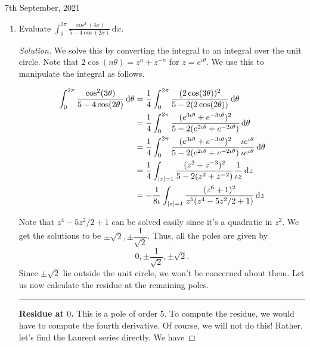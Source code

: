 \documentclass[11pt]{article}
\theoremstyle{definition}
\newenvironment{soln}{\begin{proof}[Solution]}{\end{proof}}
\begin{document}
\begin{center}
    7th September, 2021
\end{center}
\begin{enumerate}[leftmargin=*]
    \itemsep0.5em
    \item Evaluate $\displaystyle \int_0^{2\pi} \frac{\cos^2(3x)}{5-4\cos(2x)} \, \mathrm{d}x$.
    
    \begin{soln}
        We solve this by converting the integral to an integral over the unit circle. Note that $2\cos(n\theta) = z^n + z^{-n}$ for $z = e^{\iota\theta}$. We use this to manipulate the integral as follows.
        
        \begin{align*}
             \int_0^{2\pi} \frac{\cos^2(3\theta)}{5-4\cos(2\theta)} \, \mathrm{d}\theta &= \frac{1}{4} \int_0^{2\pi} \frac{(2\cos(3\theta))^2}{5-2(2\cos(2\theta))} \, \mathrm{d}\theta \\
            &= \frac{1}{4} \int_0^{2\pi} \frac{(e^{3\iota\theta} + e^{-3\iota\theta})^2}{5-2(e^{2\iota\theta} + e^{-2\iota\theta})} \, \mathrm{d}\theta \\
            &= \frac{1}{4} \int_0^{2\pi} \frac{(e^{3\iota\theta} + e^{-3\iota\theta})^2}{5-2(e^{2\iota\theta} + e^{-2\iota\theta})} \frac{\iota e^{\iota\theta}}{\iota e^{\iota\theta}} \, \mathrm{d}\theta \\
            &= \frac{1}{4} \int_{\abs{z} = 1} \frac{(z^3 + z^{-3})^2}{5 - 2(z^2 + z^{-2})} \frac{1}{\iota z} \, \mathrm{d}z \\
            &= -\frac{1}{8\iota} \int_{\abs{z}=1} \frac{(z^6+1)^2}{z^5(z^4 - 5z^2/2 + 1)} \, \mathrm{d}z
        \end{align*}
        
        Note that $z^4 - 5z^2/2 + 1$ can be solved easily since it's a quadratic in $z^2$. We get the solutions to be $\pm\sqrt{2}, \pm\dfrac{1}{\sqrt{2}}$. Thus, all the poles are given by
        \[
            0, \pm \frac{1}{\sqrt{2}}, \pm \sqrt{2}.
        \]
        Since $\pm\sqrt{2}$ lie outside the unit circle, we won't be concerned about them. Let us now calculate the residue at the remaining poles. 
        
        \par\noindent\rule{\textwidth}{0.4pt}
        
        \textbf{Residue at $0$.} This is a pole of order $5$. To compute the residue, we would have to compute the fourth derivative. Of course, we will not do this! Rather, let's find the Laurent series directly. We have
        

\end{soln}
\end{enumerate}
\end{document}
